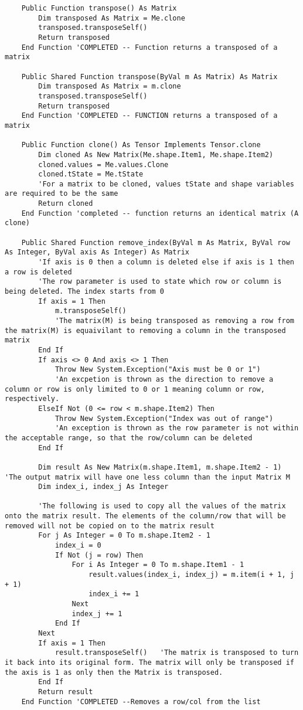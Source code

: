 \begin{verbatim}
    Public Function transpose() As Matrix
        Dim transposed As Matrix = Me.clone
        transposed.transposeSelf()
        Return transposed
    End Function 'COMPLETED -- Function returns a transposed of a matrix

    Public Shared Function transpose(ByVal m As Matrix) As Matrix
        Dim transposed As Matrix = m.clone
        transposed.transposeSelf()
        Return transposed
    End Function 'COMPLETED -- FUNCTION returns a transposed of a matrix

    Public Function clone() As Tensor Implements Tensor.clone
        Dim cloned As New Matrix(Me.shape.Item1, Me.shape.Item2)
        cloned.values = Me.values.Clone
        cloned.tState = Me.tState
        'For a matrix to be cloned, values tState and shape variables are required to be the same
        Return cloned
    End Function 'completed -- function returns an identical matrix (A clone)

    Public Shared Function remove_index(ByVal m As Matrix, ByVal row As Integer, ByVal axis As Integer) As Matrix
        'If axis is 0 then a column is deleted else if axis is 1 then a row is deleted
        'The row parameter is used to state which row or column is being deleted. The index starts from 0
        If axis = 1 Then
            m.transposeSelf()
            'The matrix(M) is being transposed as removing a row from the matrix(M) is equaivilant to removing a column in the transposed matrix
        End If
        If axis <> 0 And axis <> 1 Then
            Throw New System.Exception("Axis must be 0 or 1")
            'An excpetion is thrown as the direction to remove a column or row is only limited to 0 or 1 meaning column or row, respectively.
        ElseIf Not (0 <= row < m.shape.Item2) Then
            Throw New System.Exception("Index was out of range")
            'An exception is thrown as the row parameter is not within the acceptable range, so that the row/column can be deleted
        End If

        Dim result As New Matrix(m.shape.Item1, m.shape.Item2 - 1)  'The output matrix will have one less column than the input Matrix M
        Dim index_i, index_j As Integer

        'The following is used to copy all the values of the matrix onto the matrix result. The elements of the column/row that will be removed will not be copied on to the matrix result
        For j As Integer = 0 To m.shape.Item2 - 1
            index_i = 0
            If Not (j = row) Then
                For i As Integer = 0 To m.shape.Item1 - 1
                    result.values(index_i, index_j) = m.item(i + 1, j + 1)
                    index_i += 1
                Next
                index_j += 1
            End If
        Next
        If axis = 1 Then
            result.transposeSelf()   'The matrix is transposed to turn it back into its original form. The matrix will only be transposed if the axis is 1 as only then the Matrix is transposed.
        End If
        Return result
    End Function 'COMPLETED --Removes a row/col from the list


\end{verbatim}
